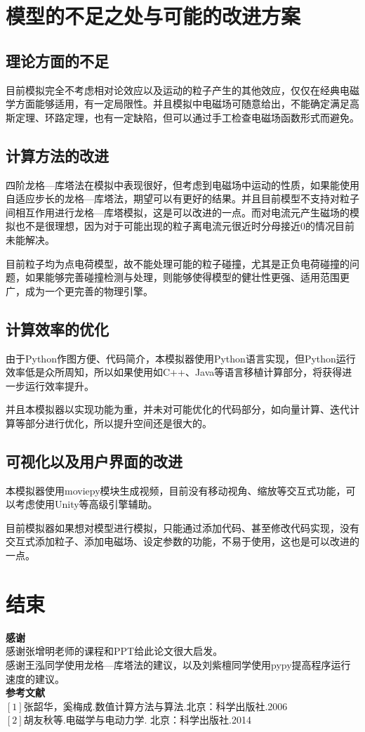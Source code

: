 \documentclass[UTF-8,cs4size]{ctexart}
\begin{document}
\section{模型的不足之处与可能的改进方案}
\subsection{理论方面的不足}
目前模拟完全不考虑相对论效应以及运动的粒子产生的其他效应，仅仅在经典电磁学方面能够适用，有一定局限性。并且模拟中电磁场可随意给出，不能确定满足高斯定理、环路定理，也有一定缺陷，但可以通过手工检查电磁场函数形式而避免。
\subsection{计算方法的改进}
四阶龙格—库塔法在模拟中表现很好，但考虑到电磁场中运动的性质，如果能使用自适应步长的龙格—库塔法，期望可以有更好的结果。并且目前模型不支持对粒子间相互作用进行龙格—库塔模拟，这是可以改进的一点。而对电流元产生磁场的模拟也不是很理想，因为对于可能出现的粒子离电流元很近时分母接近0的情况目前未能解决。


目前粒子均为点电荷模型，故不能处理可能的粒子碰撞，尤其是正负电荷碰撞的问题，如果能够完善碰撞检测与处理，则能够使得模型的健壮性更强、适用范围更广，成为一个更完善的物理引擎。
\subsection{计算效率的优化}
由于Python作图方便、代码简介，本模拟器使用Python语言实现，但Python运行效率低是众所周知，所以如果使用如C++、Java等语言移植计算部分，将获得进一步运行效率提升。


并且本模拟器以实现功能为重，并未对可能优化的代码部分，如向量计算、迭代计算等部分进行优化，所以提升空间还是很大的。
\subsection{可视化以及用户界面的改进}
本模拟器使用moviepy模块生成视频，目前没有移动视角、缩放等交互式功能，可以考虑使用Unity等高级引擎辅助。


目前模拟器如果想对模型进行模拟，只能通过添加代码、甚至修改代码实现，没有交互式添加粒子、添加电磁场、设定参数的功能，不易于使用，这也是可以改进的一点。
\section{结束}
\textbf{感谢}\\
感谢张增明老师的课程和PPT给此论文很大启发。\\
感谢王泓同学使用龙格—库塔法的建议，以及刘紫檀同学使用pypy提高程序运行速度的建议。\\


\textbf{参考文献}\\
$\left[ 1\right] $张韶华，奚梅成.数值计算方法与算法.北京：科学出版社.2006\\
$\left[ 2\right] $胡友秋等.电磁学与电动力学. 北京：科学出版社.2014
\end{document}
